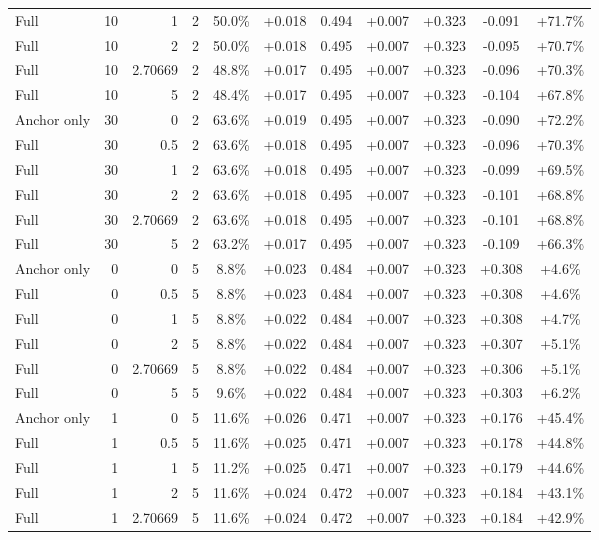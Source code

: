 \begin{table}[htbp]
\begin{tabular}{lrrrccccccc}
Full & 10 & 1 & 2 & 50.0\% & +0.018 & 0.494 & +0.007 & +0.323 & -0.091 & +71.7\% \\
Full & 10 & 2 & 2 & 50.0\% & +0.018 & 0.495 & +0.007 & +0.323 & -0.095 & +70.7\% \\
Full & 10 & 2.70669 & 2 & 48.8\% & +0.017 & 0.495 & +0.007 & +0.323 & -0.096 & +70.3\% \\
Full & 10 & 5 & 2 & 48.4\% & +0.017 & 0.495 & +0.007 & +0.323 & -0.104 & +67.8\% \\
Anchor only & 30 & 0 & 2 & 63.6\% & +0.019 & 0.495 & +0.007 & +0.323 & -0.090 & +72.2\% \\
Full & 30 & 0.5 & 2 & 63.6\% & +0.018 & 0.495 & +0.007 & +0.323 & -0.096 & +70.3\% \\
Full & 30 & 1 & 2 & 63.6\% & +0.018 & 0.495 & +0.007 & +0.323 & -0.099 & +69.5\% \\
Full & 30 & 2 & 2 & 63.6\% & +0.018 & 0.495 & +0.007 & +0.323 & -0.101 & +68.8\% \\
Full & 30 & 2.70669 & 2 & 63.6\% & +0.018 & 0.495 & +0.007 & +0.323 & -0.101 & +68.8\% \\
Full & 30 & 5 & 2 & 63.2\% & +0.017 & 0.495 & +0.007 & +0.323 & -0.109 & +66.3\% \\
Anchor only & 0 & 0 & 5 & 8.8\% & +0.023 & 0.484 & +0.007 & +0.323 & +0.308 & +4.6\% \\
Full & 0 & 0.5 & 5 & 8.8\% & +0.023 & 0.484 & +0.007 & +0.323 & +0.308 & +4.6\% \\
Full & 0 & 1 & 5 & 8.8\% & +0.022 & 0.484 & +0.007 & +0.323 & +0.308 & +4.7\% \\
Full & 0 & 2 & 5 & 8.8\% & +0.022 & 0.484 & +0.007 & +0.323 & +0.307 & +5.1\% \\
Full & 0 & 2.70669 & 5 & 8.8\% & +0.022 & 0.484 & +0.007 & +0.323 & +0.306 & +5.1\% \\
Full & 0 & 5 & 5 & 9.6\% & +0.022 & 0.484 & +0.007 & +0.323 & +0.303 & +6.2\% \\
Anchor only & 1 & 0 & 5 & 11.6\% & +0.026 & 0.471 & +0.007 & +0.323 & +0.176 & +45.4\% \\
Full & 1 & 0.5 & 5 & 11.6\% & +0.025 & 0.471 & +0.007 & +0.323 & +0.178 & +44.8\% \\
Full & 1 & 1 & 5 & 11.2\% & +0.025 & 0.471 & +0.007 & +0.323 & +0.179 & +44.6\% \\
Full & 1 & 2 & 5 & 11.6\% & +0.024 & 0.472 & +0.007 & +0.323 & +0.184 & +43.1\% \\
Full & 1 & 2.70669 & 5 & 11.6\% & +0.024 & 0.472 & +0.007 & +0.323 & +0.184 & +42.9\% \\

\end{tabular}
\end{table}
